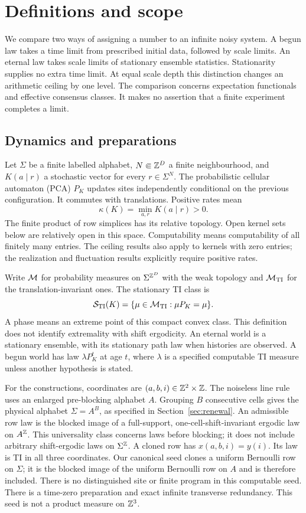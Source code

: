 \section{Definitions and scope}\label{sec:definitions}
We compare two ways of assigning a number to an infinite noisy system.
A begun law takes a time limit from prescribed initial data, followed by
scale limits. An eternal law takes scale limits of stationary ensemble
statistics. Stationarity supplies no extra time limit. At equal scale
depth this distinction changes an arithmetic ceiling by one level.
The comparison concerns expectation functionals and effective consensus
classes. It makes no assertion that a finite experiment completes a limit.

\subsection{Dynamics and preparations}
Let $\Sigma$ be a finite labelled alphabet, $N\Subset\mathbb Z^D$ a finite
neighbourhood, and $K(a\mid r)$ a stochastic vector for every
$r\in\Sigma^N$. The probabilistic cellular automaton (PCA) $P_K$
updates sites independently conditional on the previous configuration.
It commutes with translations. Positive rates mean
\[
 \kappa(K)=\min_{a,r}K(a\mid r)>0.
\]
The finite product of row simplices has its relative topology. Open
kernel sets below are relatively open in this space. Computability
means computability of all finitely many entries. The ceiling results
also apply to kernels with zero entries; the realization and
fluctuation results explicitly require positive rates.

Write $\mathcal M$ for probability measures on $\Sigma^{\mathbb Z^D}$ with the weak
topology and $\mathcal M_{\rm TI}$ for the translation-invariant ones. The
stationary TI class is
\[
 \mathcal S_{\rm TI}(K)=\{\mu\in\mathcal M_{\rm TI}:\mu P_K=\mu\}.
\]
A phase means an extreme point of this compact convex class. This
definition does not identify extremality with shift ergodicity.
An eternal world is a stationary ensemble, with its stationary path
law when histories are observed. A begun world has law
$\lambda P_K^t$ at age $t$, where $\lambda$ is a specified computable
TI measure unless another hypothesis is stated.

For the constructions, coordinates are $(a,b,i)\in\mathbb Z^2\times\mathbb Z$.
The noiseless line rule uses an enlarged pre-blocking alphabet $A$.
Grouping $B$ consecutive cells gives the physical alphabet
$\Sigma=A^B$, as specified in Section~\ref{sec:renewal}.
An admissible row law is the blocked image of a full-support,
one-cell-shift-invariant ergodic law on $A^\mathbb Z$. This universality
class concerns laws before blocking; it does not include arbitrary
shift-ergodic laws on $\Sigma^\mathbb Z$.
A cloned row has $x(a,b,i)=y(i)$. Its law is TI in all three
coordinates. Our canonical seed clones a uniform Bernoulli row on
$\Sigma$; it is the blocked image of the uniform Bernoulli row on
$A$ and is therefore included. There is no distinguished site or
finite program in this computable seed. There is a time-zero
preparation and exact infinite transverse redundancy. This seed is
not a product measure on $\mathbb Z^3$.

